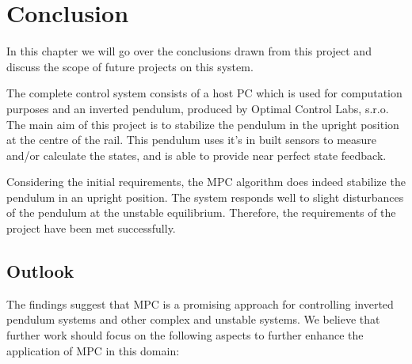 \chapter{Conclusion}\label{chap:fifth chapter}

In this chapter we will go over the conclusions drawn from this project and discuss the scope of future projects on this system. 

The complete control system consists of a host PC which is used for computation purposes and an inverted pendulum, produced by Optimal Control Labs, s.r.o. The main aim of this project is to stabilize the pendulum in the upright position at the centre of the rail. This pendulum uses it's in built sensors to measure and/or calculate the states, and is able to provide near perfect state feedback.

Considering the initial requirements, the MPC algorithm does indeed stabilize the pendulum in an upright position. The system responds well to slight disturbances of the pendulum at the unstable equilibrium. Therefore, the requirements of the project have been met successfully. 

\section{Outlook}

The findings suggest that MPC is a promising approach for controlling inverted pendulum systems and other complex and unstable systems. We believe that further work should focus on the following aspects to further enhance the application of MPC in this domain:

